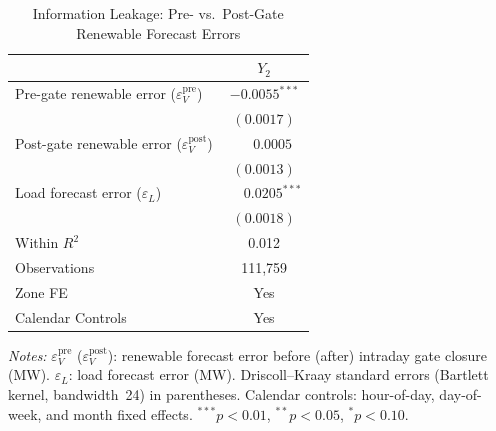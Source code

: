 \documentclass{article}
\begin{document}
\begin{table}[htbp]
\centering
\caption{Information Leakage: Pre- vs.\ Post-Gate Renewable Forecast Errors}
\label{tab:h2}
\begin{threeparttable}
\begin{tabularx}{\linewidth}{>{\raggedright\arraybackslash}Xc}
\toprule
 & $Y_2$ \\
\midrule
Pre-gate renewable error ($\varepsilon_V^{\mathrm{pre}}$) & $-0.0055^{***}$ \\
 & $(0.0017)$ \\[0.4ex]
Post-gate renewable error ($\varepsilon_V^{\mathrm{post}}$) & $\phantom{-}0.0005$ \\
 & $(0.0013)$ \\[0.4ex]
Load forecast error ($\varepsilon_L$) & $\phantom{-}0.0205^{***}$ \\
 & $(0.0018)$ \\
\midrule
Within $R^2$ & 0.012 \\
Observations & 111,759 \\
Zone FE & Yes \\
Calendar Controls & Yes \\
\bottomrule
\end{tabularx}
\begin{tablenotes}[flushleft]
\footnotesize
\item \textit{Notes:} $\varepsilon_V^{\mathrm{pre}}$ ($\varepsilon_V^{\mathrm{post}}$): renewable forecast error before (after) intraday gate closure (MW). $\varepsilon_L$: load forecast error (MW). Driscoll--Kraay standard errors (Bartlett kernel, bandwidth~24) in parentheses. Calendar controls: hour-of-day, day-of-week, and month fixed effects. $^{***}p<0.01$, $^{**}p<0.05$, $^{*}p<0.10$.
\end{tablenotes}
\end{threeparttable}
\end{table}
\end{document}
